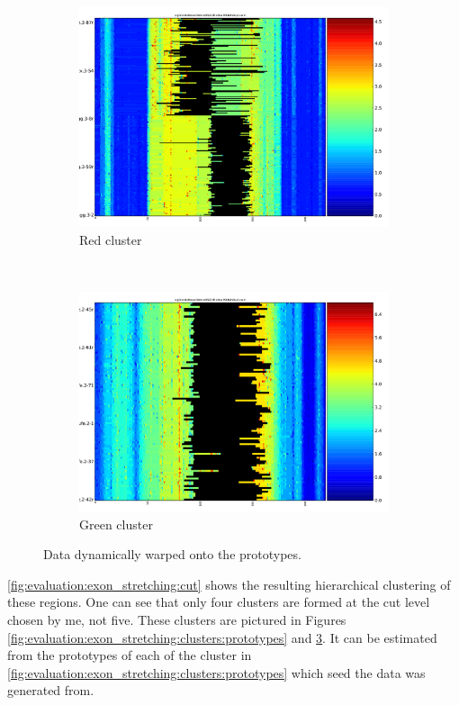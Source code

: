 \documentclass[parskip]{cs4rep}
\begin{document}
\begin{figure}[t,b]
\begin{subfigure}[b]{0.22\textwidth}
        \includegraphics[width=\textwidth]{figures/evaluation/exon_stretching/cluster-warped-3.pdf}
        \caption{Red cluster}
        \label{fig:evaluation:exon_stretching:clusters:3:warped}
    \end{subfigure}
    ~
    \begin{subfigure}[b]{0.22\textwidth}
        \includegraphics[width=\textwidth]{figures/evaluation/exon_stretching/cluster-warped-4.pdf}
        \caption{Green cluster}
        \label{fig:evaluation:exon_stretching:clusters:4:warped}
    \end{subfigure}
    \caption{Data dynamically warped onto the prototypes.}
    \label{fig:evaluation:exon_stretching:clusters:warped}
\end{figure}

\autoref{fig:evaluation:exon_stretching:cut} shows the resulting hierarchical clustering of these regions. One can see that only four clusters are formed at the cut level chosen by me, not five. 
These clusters are pictured in Figures \ref{fig:evaluation:exon_stretching:clusters:prototypes} and \ref{fig:evaluation:exon_stretching:clusters:warped}. It can be estimated from the prototypes of each of the cluster in \ref{fig:evaluation:exon_stretching:clusters:prototypes} which seed the data was generated from.
\end{document}
